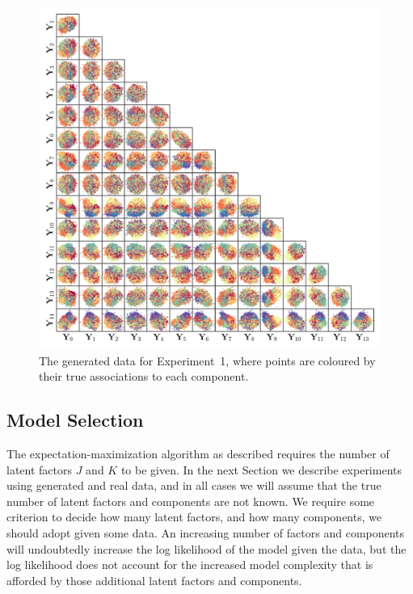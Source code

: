 \documentclass[twocolumn]{aastex62}
\newcommand{\NumLatentFactors}{J}
\newcommand{\NumComponents}{K}
\begin{document}
\begin{figure}
	\includegraphics[width=1.0\textwidth]{experiments/exp1-data-colour.pdf}
    \caption{The generated data for Experiment~1, where points are coloured by their
		     true associations to each component.}
    \label{fig:exp1-data}
\end{figure}


\subsection{Model Selection}

The expectation-maximization algorithm as described requires the number of latent
factors $\NumLatentFactors$ and $\NumComponents$ to be given. In the next Section
we describe experiments using generated and real data, and in all cases we will
assume that the true number of latent factors and components are not known. 
We require some criterion to decide how many latent factors, and how many
components, we should adopt given some data. An increasing number of factors
and components will undoubtedly increase the log likelihood of the model given
the data, but the log likelihood does not account for the increased model 
complexity that is afforded by those additional latent factors and components.
\end{document}
